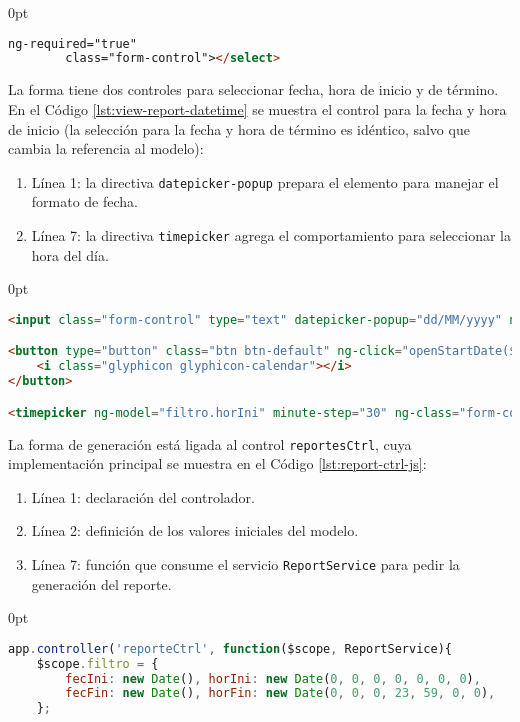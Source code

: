 \begin{enumerate}
\begin{adjustwidth}{\listingfixwidth}{0pt}
\begin{lstlisting}[language=HTML, captionpos=b, caption={Lista para seleccionar el tipo de reporte.}, label={lst:view-report-type-select}]
		ng-required="true"
		class="form-control"></select>
\end{lstlisting}
\end{adjustwidth}
La forma tiene dos controles para seleccionar fecha, hora de inicio y de término. En el Código \ref{lst:view-report-datetime} se muestra el control para la fecha y hora de inicio (la selección para la fecha y hora de término es idéntico, salvo que cambia la referencia al modelo):
\begin{enumerate}
	\item Línea 1: la directiva \texttt{datepicker-popup} prepara el elemento para manejar el formato de fecha.
	\item Línea 7: la directiva \texttt{timepicker} agrega el comportamiento para seleccionar la hora del día.
\end{enumerate}
\begin{adjustwidth}{\listingfixwidth}{0pt}
\begin{lstlisting}[language=HTML, captionpos=b, caption={Controles para seleccionar fecha y hora en la generación de reportes.}, label={lst:view-report-datetime}]
<input class="form-control" type="text" datepicker-popup="dd/MM/yyyy" ng-model="filtro.fecIni" is-open="startDateOpen" ng-required="true" starting-day="1" />

<button type="button" class="btn btn-default" ng-click="openStartDate($event)">
	<i class="glyphicon glyphicon-calendar"></i>
</button>

<timepicker ng-model="filtro.horIni" minute-step="30" ng-class="form-control"></timepicker>
\end{lstlisting}
\end{adjustwidth}
La forma de generación está ligada al control \texttt{reportesCtrl}, cuya implementación principal se muestra en el Código \ref{lst:report-ctrl-js}:
\begin{enumerate}
	\item Línea 1: declaración del controlador.
	\item Línea 2: definición de los valores iniciales del modelo.
	\item Línea 7: función que consume el servicio \texttt{ReportService} para pedir la generación del reporte.
\end{enumerate}
\begin{adjustwidth}{\listingfixwidth}{0pt}
\begin{lstlisting}[language=Javascript, caption={Servicio en \textit{AngularJS} para pedir la generación de un reporte.}, captionpos=b, label={lst:report-ctrl-js}]
app.controller('reporteCtrl', function($scope, ReportService){
	$scope.filtro = {
		fecIni: new Date(), horIni: new Date(0, 0, 0, 0, 0, 0, 0),
		fecFin: new Date(), horFin: new Date(0, 0, 0, 23, 59, 0, 0),
	};
	

\end{lstlisting}
\end{adjustwidth}
\end{enumerate}
